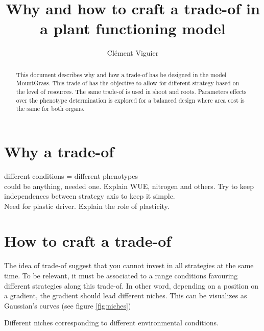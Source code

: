 \documentclass[a4paper, justified,marginals=raggedright]{tufte-handout}
\title{Why and how to craft a trade-of in a plant functioning model}
\author{Clément Viguier}
\begin{document}
\maketitle
\begin{fullwidth}
\begin{abstract}
\noindent
This document describes why and how a trade-of has be designed in the model MountGrass. This trade-of has the objective to allow for different strategy based on the level of resources. The same trade-of is used in shoot and roots. Parameters effects over the phenotype determination is explored for a balanced design where area cost is the same for both organs.
\end{abstract}
\end{fullwidth}

\section{Why a trade-of}
different conditions = different phenotypes\\
could be anything, needed one. Explain WUE, nitrogen and others. Try to keep independences between strategy axis to keep it simple.\\
Need for plastic driver. Explain the role of plasticity.

\section{How to craft a trade-of}

\indent The idea of trade-of suggest that you cannot invest in all strategies at the same time. To be relevant, it must be associated to a range conditions favouring different strategies along this trade-of. In other word, depending on a position on a gradient, the gradient should lead different niches. This can be visualizes as Gaussian's curves (see figure \ref{fig:niches})

\begin{marginfigure}[-30mm]
\label{fig:niches}
\caption{Different niches corresponding to different environmental conditions.}
\end{marginfigure}
\end{document}
